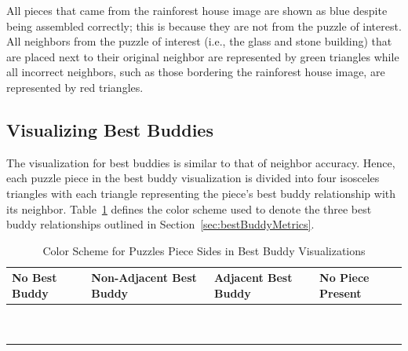 All pieces that came from the rainforest house image are shown as blue despite being assembled correctly; this is because they are not from the puzzle of interest.  All neighbors from the puzzle of interest (i.e., the glass and stone building) that are placed next to their original neighbor are represented by green triangles while all incorrect neighbors, such as those bordering the rainforest house image, are represented by red triangles.

\subsection{Visualizing Best Buddies}\label{sec:visualizingBestBuddies}

The visualization for best buddies is similar to that of neighbor accuracy.  Hence, each puzzle piece in the best buddy visualization is divided into four isosceles triangles with each triangle representing the piece's best buddy relationship with its neighbor.  Table~\ref{tab:bestBuddyColors} defines the color scheme used to denote the three best buddy relationships outlined in Section~\ref{sec:bestBuddyMetrics}.  


\begin{table}[t]
\begin{center}
  \begin{tabular}{ | >{\centering\arraybackslash}m{1.0in} | >{\centering\arraybackslash}m{1.0in} | >{\centering\arraybackslash}m{1.0in} | >{\centering\arraybackslash}m{1.0in} | }
  
   \hline
    No Best Buddy & Non-Adjacent Best Buddy & Adjacent Best Buddy & No Piece Present  \\ \hline
	{\cellcolor{white}~} & {\cellcolor{red}~} & {\cellcolor{green}~} & {\cellcolor{black}~}  \\
	{\cellcolor{white}~} & {\cellcolor{red}~} & {\cellcolor{green}~} & {\cellcolor{black}~}  \\
 \hline

  \end{tabular}
\end{center}
\caption{Color Scheme for Puzzles Piece Sides in Best Buddy Visualizations}\label{tab:bestBuddyColors}
\end{table}


